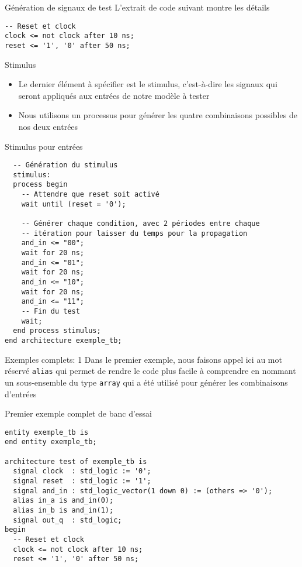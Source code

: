 \documentclass[presentation]{beamer}
\begin{document}
\begin{frame}[label={sec:org0b0c811},fragile]{Génération de signaux de test}
 L'extrait de code suivant montre les détails

\begin{verbatim}
-- Reset et clock
clock <= not clock after 10 ns;
reset <= '1', '0' after 50 ns;
\end{verbatim}
\end{frame}

\begin{frame}[label={sec:orgd38f61e}]{Stimulus}
\begin{itemize}
\item Le dernier élément à spécifier est le stimulus, c'est-à-dire les signaux qui seront appliqués aux entrées de notre modèle à tester
\item Nous utilisons un processus pour générer les quatre combinaisons possibles de nos deux entrées
\end{itemize}
\end{frame}

\begin{frame}[label={sec:orgb378acd},fragile]{Stimulus pour entrées}
 \begin{verbatim}
  -- Génération du stimulus
  stimulus:
  process begin
    -- Attendre que reset soit activé
    wait until (reset = '0');

    -- Générer chaque condition, avec 2 périodes entre chaque
    -- itération pour laisser du temps pour la propagation
    and_in <= "00";
    wait for 20 ns;
    and_in <= "01";
    wait for 20 ns;
    and_in <= "10";
    wait for 20 ns;
    and_in <= "11";
    -- Fin du test
    wait;
  end process stimulus;
end architecture exemple_tb;
\end{verbatim}
\end{frame}

\begin{frame}[label={sec:org2ceea76},fragile]{Exemples complets: 1}
 Dans le premier exemple, nous faisons appel ici au mot réservé \texttt{alias} qui permet de rendre le code plus facile à comprendre en nommant un sous-ensemble du type \texttt{array} qui a été utilisé pour générer les combinaisons d'entrées
\end{frame}

\begin{frame}[label={sec:org3e9a6f1},fragile]{Premier exemple complet de banc d'essai}
 \begin{verbatim}
entity exemple_tb is
end entity exemple_tb;

architecture test of exemple_tb is
  signal clock  : std_logic := '0';
  signal reset  : std_logic := '1';
  signal and_in : std_logic_vector(1 down 0) := (others => '0');
  alias in_a is and_in(0);
  alias in_b is and_in(1);
  signal out_q  : std_logic;
begin
  -- Reset et clock
  clock <= not clock after 10 ns;
  reset <= '1', '0' after 50 ns;
\end{verbatim}
\end{frame}
\end{document}
